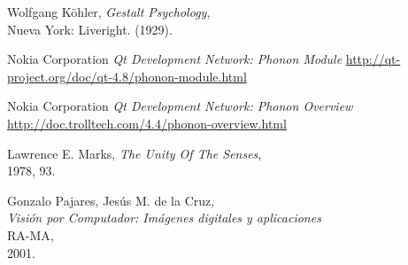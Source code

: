 \begin{thebibliography}{9}
 Wolfgang Köhler,
 \emph{Gestalt Psychology},\\
 Nueva York: Liveright. (1929).

 Nokia Corporation
 \emph{Qt Development Network: Phonon Module}
 \url{http://qt-project.org/doc/qt-4.8/phonon-module.html}
 
 Nokia Corporation
 \emph{Qt Development Network: Phonon Overview}
 \url{http://doc.trolltech.com/4.4/phonon-overview.html}

 Lawrence E. Marks,
 \emph{The Unity Of The Senses},\\
 1978, 93.

 Gonzalo Pajares, Jesús M. de la Cruz,\\
 \emph{Visión por Computador: Imágenes digitales y aplicaciones}\\
 RA-MA,\\
 2001.

\end{thebibliography}